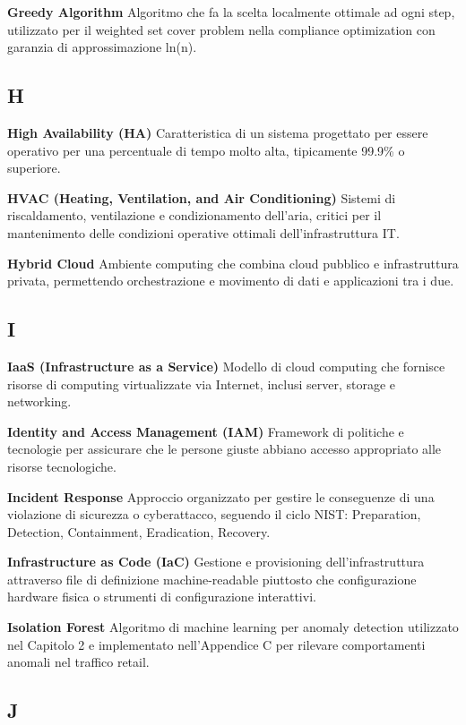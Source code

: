 \documentclass{report}
\begin{document}
\textbf{Greedy Algorithm} Algoritmo che fa la scelta localmente ottimale
ad ogni step, utilizzato per il weighted set cover problem nella
compliance optimization con garanzia di approssimazione ln(n).

\subsection{H}\label{h}

\textbf{High Availability (HA)} Caratteristica di un sistema progettato
per essere operativo per una percentuale di tempo molto alta,
tipicamente 99.9\% o superiore.

\textbf{HVAC (Heating, Ventilation, and Air Conditioning)} Sistemi di
riscaldamento, ventilazione e condizionamento dell'aria, critici per il
mantenimento delle condizioni operative ottimali dell'infrastruttura IT.

\textbf{Hybrid Cloud} Ambiente computing che combina cloud pubblico e
infrastruttura privata, permettendo orchestrazione e movimento di dati e
applicazioni tra i due.

\subsection{I}\label{i}

\textbf{IaaS (Infrastructure as a Service)} Modello di cloud computing
che fornisce risorse di computing virtualizzate via Internet, inclusi
server, storage e networking.

\textbf{Identity and Access Management (IAM)} Framework di politiche e
tecnologie per assicurare che le persone giuste abbiano accesso
appropriato alle risorse tecnologiche.

\textbf{Incident Response} Approccio organizzato per gestire le
conseguenze di una violazione di sicurezza o cyberattacco, seguendo il
ciclo NIST: Preparation, Detection, Containment, Eradication, Recovery.

\textbf{Infrastructure as Code (IaC)} Gestione e provisioning
dell'infrastruttura attraverso file di definizione machine-readable
piuttosto che configurazione hardware fisica o strumenti di
configurazione interattivi.

\textbf{Isolation Forest} Algoritmo di machine learning per anomaly
detection utilizzato nel Capitolo 2 e implementato nell'Appendice C per
rilevare comportamenti anomali nel traffico retail.

\subsection{J}\label{j}
\end{document}
